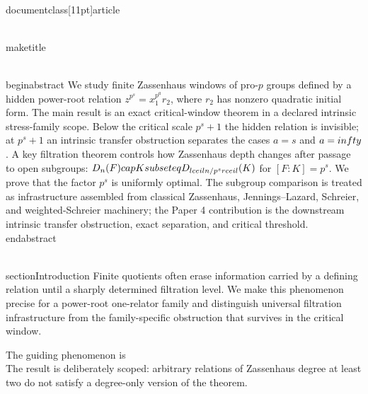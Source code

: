 \\documentclass[11pt]{article}
\begin{document}
\\maketitle

\\begin{abstract}
We study finite Zassenhaus windows of pro-$p$ groups defined by a hidden power-root relation
$z^{p^s}=x_1^{p^a}r_2$, where $r_2$ has nonzero quadratic initial form. The main result is an exact critical-window theorem in a declared intrinsic stress-family scope. Below the critical scale $p^s+1$ the hidden relation is invisible; at $p^s+1$ an intrinsic transfer obstruction separates the cases $a=s$ and $a=\\infty$. A key filtration theorem controls how Zassenhaus depth changes after passage to open subgroups:
$D_n(F)\\cap K\\subseteq D_{\\lceil n/p^s\\rceil}(K)$ for $[F:K]=p^s$. We prove that the factor $p^s$ is uniformly optimal. The subgroup comparison is treated as infrastructure assembled from classical Zassenhaus, Jennings--Lazard, Schreier, and weighted-Schreier machinery; the Paper 4 contribution is the downstream intrinsic transfer obstruction, exact separation, and critical threshold.
\\end{abstract}

\\section{Introduction}
Finite quotients often erase information carried by a defining relation until a sharply determined filtration level. We make this phenomenon precise for a power-root one-relator family and distinguish universal filtration infrastructure from the family-specific obstruction that survives in the critical window.

The guiding phenomenon is
\\[
\\text{lower-window blindness}
\\quad\\longrightarrow\\quad
\\text{critical transfer defect}
\\quad\\longrightarrow\\quad
\\text{exact separation}.
\\]
The result is deliberately scoped: arbitrary relations of Zassenhaus degree at least two do not satisfy a degree-only version of the theorem.
\end{document}
